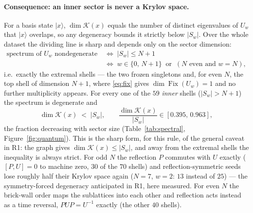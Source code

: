 \documentclass[11pt]{article}
\providecommand{\ket}[1]{|#1\rangle}
\newcommand{\Fix}{\operatorname{Fix}}
\theoremstyle{plain}
\theoremstyle{definition}
\begin{document}
\paragraph{Consequence: an inner sector is never a Krylov space.} For a basis
state $\ket{x}$, $\dim\mathcal{K}(x)$ equals the number of distinct eigenvalues of
$U_w$ that $\ket{x}$ overlaps, so any degeneracy bounds it strictly below
$|S_w|$. Over the whole dataset the dividing line is sharp and depends only on
the sector dimension:
\begin{equation}
\begin{aligned}
  \text{spectrum of } U_w \text{ nondegenerate}
  \;&\iff\; |S_w| \le N+1 \\
  \;&\iff\; w \in \{0,\,N+1\} \ \text{ or }\ (N \text{ even and } w = N),
\end{aligned}
\end{equation}
i.e.\ exactly the extremal shells --- the two frozen singletons and, for even
$N$, the top shell of dimension $N+1$, where \eqref{eq:fix} gives
$\dim\Fix(U_w)=1$ and no further multiplicity appears. For every one of the $59$
\emph{inner} shells ($|S_w|>N+1$) the spectrum is degenerate and
\begin{equation}
  \dim\mathcal{K}(x) \;<\; |S_w|,
  \qquad \frac{\dim\mathcal{K}(x)}{|S_w|} \in [0.395,\,0.963],
\end{equation}
the fraction decreasing with sector size (Table~\ref{tab:spectral},
Figure~\ref{fig:quantum}). This is the sharp form, for this rule, of the general
caveat in R1: the graph gives $\dim\mathcal{K}(x)\le|S_w|$, and away from the
extremal shells the inequality is always strict. For odd $N$ the reflection $P$
commutes with $U$ exactly ($[P,U]=0$ to machine zero, $30$ of the $70$ shells)
and reflection-symmetric seeds lose roughly half their Krylov space again
($N=7$, $w=2$: $13$ instead of $25$) --- the symmetry-forced degeneracy
anticipated in R1, here measured. For even $N$ the brick-wall order maps the
sublattices into each other and reflection acts instead as a time reversal,
$PUP = U^{-1}$ exactly (the other $40$ shells).
\end{document}

